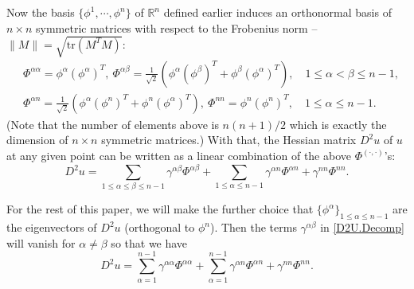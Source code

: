 \documentclass[12pt]{article}
\numberwithin{equation}{section}
\theoremstyle{plain}
\theoremstyle{definition}
\theoremstyle{remark}
\begin{document}
Now the basis $\{\phi^1, \cdots, \phi^n\}$ of $\mathbb{R}^n$ defined earlier induces an orthonormal basis of $n \times n$ symmetric matrices with respect to the Frobenius norm -- $\|M\| = \sqrt{\text{tr}(M^TM)}$: 
\begin{equation}\label{eq:PhiBasis}
\begin{split}
    &  \Phi^{\alpha \alpha} = \phi^{\alpha} (\phi^{\alpha})^T, \ \Phi^{\alpha \beta} = \frac{1}{\sqrt{2}} \left( \phi^{\alpha} (\phi^{\beta})^T + \phi^{\beta} (\phi^{\alpha})^T \right), \quad 1\leq \alpha < \beta \leq n-1,  \\
    &  \Phi^{\alpha n} = \frac{1}{\sqrt{2}} \left( \phi^{\alpha} (\phi^{n})^T + \phi^{n} (\phi^{\alpha})^T \right), \ \Phi^{n n} = \phi^{n} (\phi^{n})^T, \quad 1 \leq \alpha \leq n-1.
\end{split}
\end{equation}
(Note that the number of elements above is $n(n+1)/2$ which is exactly the dimension of $n\times n$ symmetric
matrices.) With that, the Hessian matrix $D^2u$ of $u$ at any given point can be written as a linear combination of the above $\Phi^{(\cdot, \cdot)}$'s:
\begin{equation}\label{D2U.Decomp}
    D^2 u =  \sum_{1\leq \alpha\leq\beta\leq n-1} \gamma^{\alpha \beta} \Phi^{\alpha \beta} + \sum_{1\leq\alpha\leq n-1} \gamma^{\alpha n} \Phi^{\alpha n} + \gamma^{n n} \Phi^{n n}.
\end{equation}

For the rest of this paper, we will make the further choice that 
$\big\{\phi^\alpha\big\}_{1\leq\alpha\leq n-1}$ are the eigenvectors of $D^2u$ (orthogonal to $\phi^n$).
Then the terms $\gamma^{\alpha \beta}$ in \eqref{D2U.Decomp} will vanish for $\alpha \neq \beta$ so that we have
\begin{equation*}
    D^2 u = \sum_{\alpha=1}^{n-1} \gamma^{\alpha \alpha} \Phi^{\alpha \alpha} + \sum_{\alpha=1}^{n-1} \gamma^{\alpha n} \Phi^{\alpha n} + \gamma^{n n} \Phi^{n n}.
\end{equation*}
\end{document}
